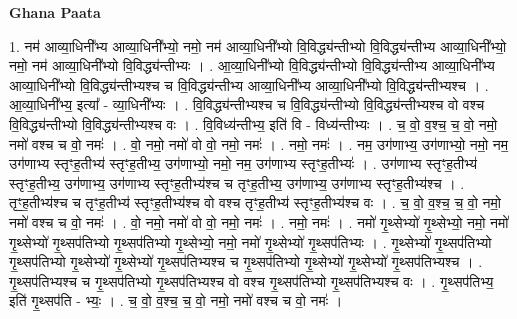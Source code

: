 \documentclass[17pt]{extarticle}
\begin{document}
\textbf{Ghana Paata } \newline

1. नम॑ आव्या॒धिनी᳚भ्य आव्या॒धिनी᳚भ्यो॒ नमो॒ नम॑ आव्या॒धिनी᳚भ्यो वि॒विद्ध्य॑न्तीभ्यो वि॒विद्ध्य॑न्तीभ्य आव्या॒धिनी᳚भ्यो॒ नमो॒ नम॑ आव्या॒धिनी᳚भ्यो वि॒विद्ध्य॑न्तीभ्यः । . आ॒व्या॒धिनी᳚भ्यो वि॒विद्ध्य॑न्तीभ्यो वि॒विद्ध्य॑न्तीभ्य आव्या॒धिनी᳚भ्य आव्या॒धिनी᳚भ्यो वि॒विद्ध्य॑न्तीभ्यश्च च वि॒विद्ध्य॑न्तीभ्य आव्या॒धिनी᳚भ्य आव्या॒धिनी᳚भ्यो वि॒विद्ध्य॑न्तीभ्यश्च । . आ॒व्या॒धिनी᳚भ्य॒ इत्या᳚ - व्या॒धिनी᳚भ्यः । . वि॒विद्ध्य॑न्तीभ्यश्च च वि॒विद्ध्य॑न्तीभ्यो वि॒विद्ध्य॑न्तीभ्यश्च वो वश्च वि॒विद्ध्य॑न्तीभ्यो वि॒विद्ध्य॑न्तीभ्यश्च वः । . वि॒विध्य॑न्तीभ्य॒ इति॑ वि - विध्य॑न्तीभ्यः । . च॒ वो॒ व॒श्च॒ च॒ वो॒ नमो॒ नमो॑ वश्च च वो॒ नमः॑ । . वो॒ नमो॒ नमो॑ वो वो॒ नमो॒ नमः॑ । . नमो॒ नमः॑ । . नम॒ उग॑णाभ्य॒ उग॑णाभ्यो॒ नमो॒ नम॒ उग॑णाभ्य स्तृꣳह॒तीभ्य॑ स्तृꣳह॒तीभ्य॒ उग॑णाभ्यो॒ नमो॒ नम॒ उग॑णाभ्य स्तृꣳह॒तीभ्यः॑ । . उग॑णाभ्य स्तृꣳह॒तीभ्य॑ स्तृꣳह॒तीभ्य॒ उग॑णाभ्य॒ उग॑णाभ्य स्तृꣳह॒तीभ्य॑श्च च तृꣳह॒तीभ्य॒ उग॑णाभ्य॒ उग॑णाभ्य स्तृꣳह॒तीभ्य॑श्च । . तृꣳ॒॒ह॒तीभ्य॑श्च च तृꣳह॒तीभ्य॑ स्तृꣳह॒तीभ्य॑श्च वो वश्च तृꣳह॒तीभ्य॑ स्तृꣳह॒तीभ्य॑श्च वः । . च॒ वो॒ व॒श्च॒ च॒ वो॒ नमो॒ नमो॑ वश्च च वो॒ नमः॑ । . वो॒ नमो॒ नमो॑ वो वो॒ नमो॒ नमः॑ । . नमो॒ नमः॑ । . नमो॑ गृ॒थ्सेभ्यो॑ गृ॒थ्सेभ्यो॒ नमो॒ नमो॑ गृ॒थ्सेभ्यो॑ गृ॒थ्सप॑तिभ्यो गृ॒थ्सप॑तिभ्यो गृ॒थ्सेभ्यो॒ नमो॒ नमो॑ गृ॒थ्सेभ्यो॑ गृ॒थ्सप॑तिभ्यः । . गृ॒थ्सेभ्यो॑ गृ॒थ्सप॑तिभ्यो गृ॒थ्सप॑तिभ्यो गृ॒थ्सेभ्यो॑ गृ॒थ्सेभ्यो॑ गृ॒थ्सप॑तिभ्यश्च च गृ॒थ्सप॑तिभ्यो गृ॒थ्सेभ्यो॑ गृ॒थ्सेभ्यो॑ गृ॒थ्सप॑तिभ्यश्च । . गृ॒थ्सप॑तिभ्यश्च च गृ॒थ्सप॑तिभ्यो गृ॒थ्सप॑तिभ्यश्च वो वश्च गृ॒थ्सप॑तिभ्यो गृ॒थ्सप॑तिभ्यश्च वः । . गृ॒थ्सप॑तिभ्य॒ इति॑ गृ॒थ्सप॑ति - भ्यः॒ । . च॒ वो॒ व॒श्च॒ च॒ वो॒ नमो॒ नमो॑ वश्च च वो॒ नमः॑ । \newline
\end{document}
